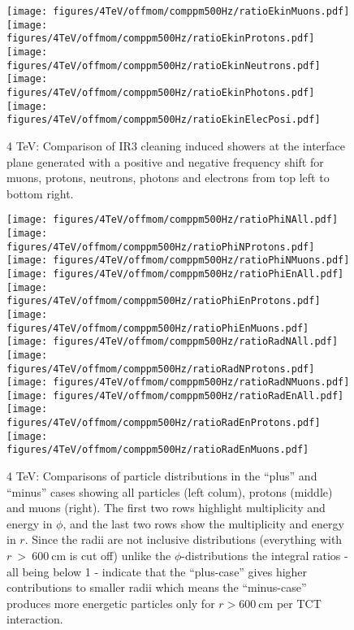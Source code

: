 \begin{figure}%
\begin{center}
  \texttt{[image: figures/4TeV/offmom/comppm500Hz/ratioEkinMuons.pdf]}
  \texttt{[image: figures/4TeV/offmom/comppm500Hz/ratioEkinProtons.pdf]}
  \texttt{[image: figures/4TeV/offmom/comppm500Hz/ratioEkinNeutrons.pdf]}
  \texttt{[image: figures/4TeV/offmom/comppm500Hz/ratioEkinPhotons.pdf]}
  \texttt{[image: figures/4TeV/offmom/comppm500Hz/ratioEkinElecPosi.pdf]}
\end{center}
\vspace{-0.6cm}
 \caption{4 TeV: Comparison of IR3 cleaning induced showers at the interface plane generated with a positive and negative frequency shift for muons, protons, neutrons, photons and electrons from top left to bottom right.
  \label{compPM_ekin}}
\end{figure}

\begin{figure}%
\begin{center}
  \texttt{[image: figures/4TeV/offmom/comppm500Hz/ratioPhiNAll.pdf]}
  \texttt{[image: figures/4TeV/offmom/comppm500Hz/ratioPhiNProtons.pdf]}
  \texttt{[image: figures/4TeV/offmom/comppm500Hz/ratioPhiNMuons.pdf]}
  \texttt{[image: figures/4TeV/offmom/comppm500Hz/ratioPhiEnAll.pdf]}
  \texttt{[image: figures/4TeV/offmom/comppm500Hz/ratioPhiEnProtons.pdf]}
  \texttt{[image: figures/4TeV/offmom/comppm500Hz/ratioPhiEnMuons.pdf]}
  \texttt{[image: figures/4TeV/offmom/comppm500Hz/ratioRadNAll.pdf]}
  \texttt{[image: figures/4TeV/offmom/comppm500Hz/ratioRadNProtons.pdf]}
  \texttt{[image: figures/4TeV/offmom/comppm500Hz/ratioRadNMuons.pdf]}
  \texttt{[image: figures/4TeV/offmom/comppm500Hz/ratioRadEnAll.pdf]}
  \texttt{[image: figures/4TeV/offmom/comppm500Hz/ratioRadEnProtons.pdf]}
  \texttt{[image: figures/4TeV/offmom/comppm500Hz/ratioRadEnMuons.pdf]}
\end{center}
\vspace{-0.6cm}
\caption{4 TeV: Comparisons of particle distributions in the ``plus'' and ``minus'' cases showing all particles (left colum), protons (middle) and muons (right). 
The first two rows highlight multiplicity and energy in $\phi$, and the last two rows show the multiplicity and energy in $r$. Since the radii are not inclusive distributions (everything with $r~>~600~$cm is cut off) unlike the $\phi$-distributions the integral ratios - all being below 1 - indicate that the ``plus-case'' gives higher contributions to smaller radii which means the ``minus-case'' produces more energetic particles only for $r > 600~$cm per TCT interaction. 
  \label{compPM_phien}}
\end{figure}
\newpage


